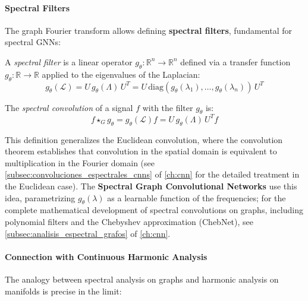 \paragraph{Spectral Filters}

The graph Fourier transform allows defining \textbf{spectral filters}, fundamental for spectral \glspl{GNN}:

\begin{definition}\label{def:filtro_espectral_grafo}
	A \textit{spectral filter} is a linear operator $g_\theta: \mathbb{R}^n \to \mathbb{R}^n$ defined via a transfer function $g_\theta: \mathbb{R} \to \mathbb{R}$ applied to the eigenvalues of the Laplacian:
	\[
		g_\theta(\mathcal{L}) = U \, g_\theta(\Lambda) \, U^T = U \, \text{diag}(g_\theta(\lambda_1), \ldots, g_\theta(\lambda_n)) \, U^T
	\]

	The \textit{spectral convolution} of a signal $f$ with the filter $g_\theta$ is:
	\[
		f \star_G g_\theta = g_\theta(\mathcal{L}) f = U \, g_\theta(\Lambda) \, U^T f
	\]
\end{definition}

This definition generalizes the Euclidean convolution, where the convolution theorem establishes that convolution in the spatial domain is equivalent to multiplication in the Fourier domain (see \autoref{subsec:convoluciones_espectrales_cnns} of \autoref{ch:cnn} for the detailed treatment in the Euclidean case). The \textbf{Spectral Graph Convolutional Networks} \citep{bruna2014spectralnetworkslocallyconnected} use this idea, parametrizing $g_\theta(\lambda)$ as a learnable function of the frequencies; for the complete mathematical development of spectral convolutions on graphs, including polynomial filters and the Chebyshev approximation (ChebNet), see \autoref{subsec:analisis_espectral_grafos} of \autoref{ch:cnn}.

\paragraph{Connection with Continuous Harmonic Analysis}

The analogy between spectral analysis on graphs and harmonic analysis on manifolds is precise in the limit:

